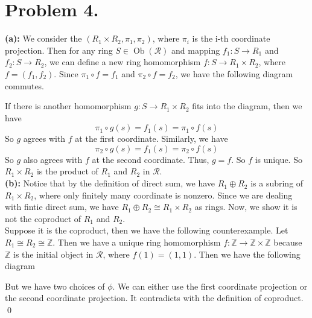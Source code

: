 \documentclass[12pt]{amsart}
\newcommand{\Z}{\mathbb{Z}}
\newcommand{\Ob}[0]{\operatorname{Ob}}
\begin{document}
\section*{Problem 4.}
\noindent\textbf{(a):} We consider the $(R_1\times R_2,\pi_1,\pi_2)$, where $\pi_i$ is the i-th coordinate projection. Then for any ring $S\in \Ob(\mathcal{R} )$ and mapping $f_1: S\to R_1$ and $f_2:S\to R_2$, we can define a new ring homomorphism $f:S\to R_1\times R_2$, where $f=(f_1,f_2)$. Since $\pi_1\circ f= f_1$ and $\pi_2\circ  f= f_2$, we have the following diagram commutes.
\begin{center}
\end{center}
If there is another homomorphism $g:S\to R_1\times R_2$ fits into the diagram, then we have
\[\pi_1\circ g(s)=f_1(s)=\pi_1\circ f(s)\]
So $g$ agrees with $f$ at the first coordinate. Similarly, we have
\[\pi_2\circ g(s)=f_1(s)=\pi_2\circ f(s)\]
So $g$ also agrees with $f$ at the second coordinate. Thus, $g=f$. So $f$ is unique. So $R_1\times R_2$ is the product of $R_1$ and $R_2$ in $\mathcal{R}$.\\
\textbf{(b):} Notice that by the definition of direct sum, we have $R_1\oplus R_2$ is a subring of $R_1\times R_2$, where only finitely many coordinate is nonzero. Since we are dealing with fintie direct sum, we have $R_1\oplus R_2\cong R_1\times R_2$ as rings. Now, we show it is not the coproduct of $R_1$ and $R_2$.\\
Suppose it is the coproduct, then we have the following counterexample. Let $R_1\cong R_2\cong \Z$. Then we have a unique ring homomorphism $f:\Z\to \Z\times \Z$ because $\Z$ is the initial object in $\mathcal{R}$, where $f(1)=(1,1)$. Then we have the following diagram
\begin{center}
\end{center}
But we have two choices of $\phi$. We can either use the first coordinate projection or the second coordinate projection. It contradicts with the definition of coproduct.\\\qed
\end{document}
